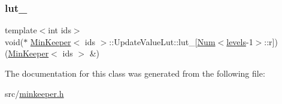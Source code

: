 \subsubsection{\texorpdfstring{lut\+\_\+}{lut\_}}
{\footnotesize\ttfamily template$<$int ids$>$ \\
void($\ast$ \hyperlink{classMinKeeper}{Min\+Keeper}$<$ ids $>$\+::Update\+Value\+Lut\+::lut\+\_\+\mbox{[}\hyperlink{structMinKeeper_1_1Num}{Num}$<$\hyperlink{classMinKeeper_a745fcad4766af72248c4f26e8fb5b754aea945fa5cad053f00154ef3bf621ea51}{levels}-\/1$>$\+::r\mbox{]})(\hyperlink{classMinKeeper}{Min\+Keeper}$<$ ids $>$ \&)\hspace{0.3cm}{\ttfamily [private]}}



The documentation for this class was generated from the following file\+:\begin{DoxyCompactItemize}
\item 
src/\hyperlink{minkeeper_8h}{minkeeper.\+h}\end{DoxyCompactItemize}
